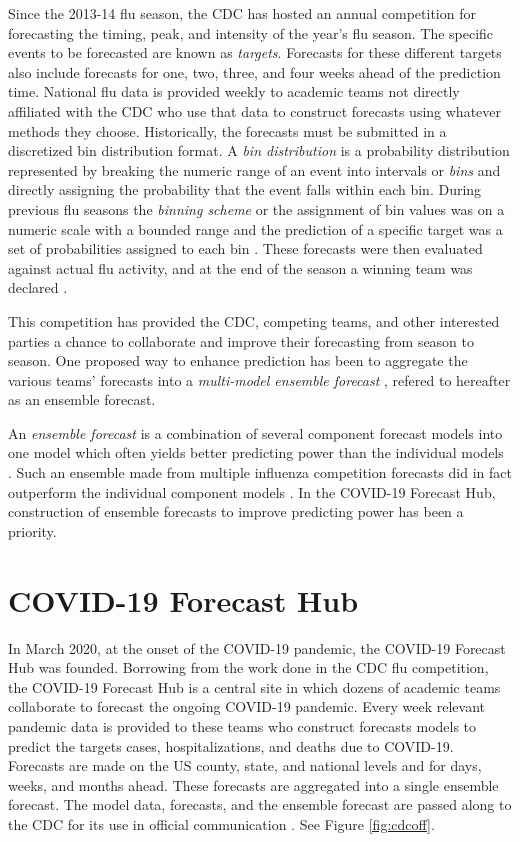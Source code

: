 \documentclass[11pt,notitlepage]{isuthesis}
\begin{document}
Since the 2013-14 flu season, the CDC has hosted an annual competition for 
forecasting the timing, peak, and intensity of the year's flu 
season. The specific events to be forecasted are known as \emph{targets}.
Forecasts
for these different targets also include forecasts for one, two, three, and 
four weeks ahead of the prediction time. National flu data is provided weekly 
to academic teams not directly affiliated with the CDC who use that data to 
construct forecasts using 
whatever methods they choose. Historically, the forecasts must be 
submitted 
in a discretized bin distribution
format. A \emph{bin distribution} is a probability distribution represented by
breaking the numeric range of an event into intervals or \emph{bins} and
directly assigning the probability that the event falls within each bin.
During previous flu seasons the \emph{binning scheme} or the assignment of 
bin values was on a numeric 
scale with a bounded range and the 
prediction of a specific target was a set of probabilities assigned to each bin
\cite{mcgowan2019collaborative}.
These forecasts were then evaluated against actual flu activity, and at 
the end of the season a winning team was declared \cite{cdcflusight}.

This competition has provided the CDC, competing teams, and other interested
parties a chance to collaborate and improve their forecasting from season to
season. One 
proposed way to enhance prediction has been to aggregate the various teams'
forecasts into a \emph{multi-model ensemble forecast} 
\cite{mcgowan2019collaborative,mcandrew2019adaptively,reich2019accuracy},
refered to hereafter as an ensemble forecast.

An \emph{ensemble forecast} is a combination of several component forecast 
models into one model which often yields better predicting power than the 
individual models \cite{cramer2021evaluation}. Such an ensemble made from 
multiple influenza competition forecasts did in fact outperform the individual 
component models \cite{reich2019accuracy}.
In the COVID-19 Forecast Hub, construction of ensemble forecasts to improve
predicting power has been a priority.



\section{COVID-19 Forecast Hub}
In March 2020, at the onset of the COVID-19 pandemic, the COVID-19 Forecast Hub
was founded. Borrowing from the work done in the CDC flu competition, the 
COVID-19 Forecast Hub is a central site in 
which dozens of academic teams collaborate to forecast the ongoing COVID-19 
pandemic.
Every week relevant
pandemic data is provided to these teams who construct forecasts models to 
predict the targets cases, hospitalizations, and deaths due to COVID-19. 
Forecasts are 
made on the US county,
state, and national levels and for days, weeks, and months ahead.
These forecasts are aggregated into a single ensemble forecast. The model data,
forecasts, and the ensemble forecast are passed along to the CDC for its use in 
official
communication \cite{Cramer2021-hub-dataset}. See Figure \ref{fig:cdcoff}.
\end{document}
